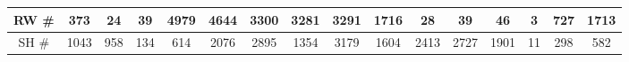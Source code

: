 \begin{table}[H]
\begin{tabular}{|c|c|c|c|c|c|c|c|c|c|c|c|c|c|c|c|}
		RW \# & \cellcolor[HTML]{ECF4FF}373                                              & \cellcolor[HTML]{ECF4FF}24                                               & \cellcolor[HTML]{ECF4FF}39                                               & \cellcolor[HTML]{ECF4FF}4979                                            & \cellcolor[HTML]{ECF4FF}4644                                           & \cellcolor[HTML]{ECF4FF}3300                                           & \cellcolor[HTML]{ECF4FF}3281                                           & \cellcolor[HTML]{ECF4FF}3291                                             & \cellcolor[HTML]{ECF4FF}1716                                             & \cellcolor[HTML]{ECF4FF}28                                               & \cellcolor[HTML]{ECF4FF}39                                               & \cellcolor[HTML]{ECF4FF}46                                               & \cellcolor[HTML]{ECF4FF}3                                                & \cellcolor[HTML]{ECF4FF}727                                              & \cellcolor[HTML]{ECF4FF}1713                                             \\ \hline
		SH \# & \cellcolor[HTML]{CBCEFB}1043                                             & \cellcolor[HTML]{CBCEFB}958                                              & \cellcolor[HTML]{CBCEFB}134                                              & \cellcolor[HTML]{CBCEFB}614                                             & \cellcolor[HTML]{CBCEFB}2076                                           & \cellcolor[HTML]{CBCEFB}2895                                           & \cellcolor[HTML]{CBCEFB}1354                                           & \cellcolor[HTML]{CBCEFB}3179                                             & \cellcolor[HTML]{CBCEFB}1604                                             & \cellcolor[HTML]{CBCEFB}2413                                             & \cellcolor[HTML]{CBCEFB}2727                                             & \cellcolor[HTML]{CBCEFB}1901                                             & \cellcolor[HTML]{CBCEFB}11                                               & \cellcolor[HTML]{CBCEFB}298                                              & \cellcolor[HTML]{CBCEFB}582                                              \\ \hline

\end{tabular}
\end{table}
